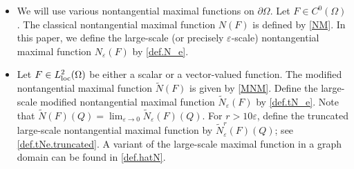 \documentclass[reqno,12pt]{amsart} %
\theoremstyle{definition}
\theoremstyle{remark}
\numberwithin{equation}{section}
\newcommand{\e}{\varepsilon}
\begin{document}
\begin{itemize}
    \item We will use various nontangential maximal functions on $ \partial \Omega$.
    Let $F \in C^0(\Omega)$. The classical nontangential maximal function $N(F)$ is defined by \eqref{NM}.
    In this paper, we define the large-scale (or precisely $\e$-scale) nontangential maximal function $N_\e (F)$ by \eqref{def.N_e}.
    
    \item Let $F \in L^2_{\rm loc}(\Omega)$ be either a scalar or a vector-valued function. The modified nontangential maximal function $\widetilde{N}(F)$ is given by \eqref{MNM}.
    Define the large-scale modified nontangential maximal function $\widetilde{N}_\e(F)$ by \eqref{def.tN_e}. 
    Note that  $\widetilde{N}(F)(Q) = \lim_{\e \to 0} \widetilde{N}_\e(F)(Q)$.
    For $r> 10\e$, define the truncated large-scale nontangential maximal function by $\widetilde{N}_\e^r(F)(Q)$; see \eqref{def.tNe.truncated}.
    A variant of the large-scale maximal function in a graph domain can be found in \eqref{def.hatN}.


\end{itemize}
\end{document}
